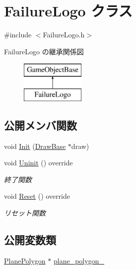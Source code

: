 \hypertarget{class_failure_logo}{}\section{Failure\+Logo クラス}
\label{class_failure_logo}


{\ttfamily \#include $<$Failure\+Logo.\+h$>$}

Failure\+Logo の継承関係図\begin{figure}[H]
\begin{center}
\leavevmode
\includegraphics[height=2.000000cm]{class_failure_logo}
\end{center}
\end{figure}
\subsection*{公開メンバ関数}
\begin{DoxyCompactItemize}
\item 
void \mbox{\hyperlink{class_failure_logo_a22da89def55023f43860cf646da7a74c}{Init}} (\mbox{\hyperlink{class_draw_base}{Draw\+Base}} $\ast$draw)
\item 
void \mbox{\hyperlink{class_failure_logo_adbe01fc4567ade0e788f511f5162299c}{Uninit}} () override
\begin{DoxyCompactList}\small\item\em 終了関数 \end{DoxyCompactList}\item 
void \mbox{\hyperlink{class_failure_logo_a542b1617087a6701f7edb345e2a72e01}{Reset}} () override
\begin{DoxyCompactList}\small\item\em リセット関数 \end{DoxyCompactList}\end{DoxyCompactItemize}
\subsection*{公開変数類}
\begin{DoxyCompactItemize}
\item 
\mbox{\hyperlink{class_plane_polygon}{Plane\+Polygon}} $\ast$ \mbox{\hyperlink{class_failure_logo_ab41feac9836e9687c75546098ff8f53c}{plane\+\_\+polygon\+\_\+}}
\end{DoxyCompactItemize}

